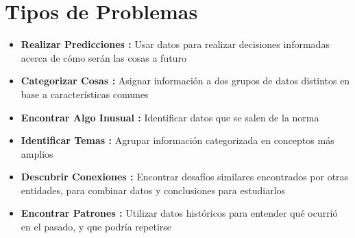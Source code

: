 \section{Tipos de Problemas}

\begin{itemize}
    \item {\textbf{Realizar Predicciones : }Usar datos para realizar decisiones informadas acerca de cómo serán las cosas a futuro}
    \item {\textbf{Categorizar Cosas : }Asignar información a dos grupos de datos distintos en base a características comunes}
    \item {\textbf{Encontrar Algo Inusual : }Identificar datos que se salen de la norma}
    \item {\textbf{Identificar Temas : }Agrupar información categorizada en conceptos más amplios}
    \item {\textbf{Descubrir Conexiones : }Encontrar desafíos similares encontrados por otras entidades, para combinar datos y conclusiones para estudiarlos}
    \item {\textbf{Encontrar Patrones : }Utilizar datos históricos para entender qué ocurrió en el pasado, y que podría repetirse}
\end{itemize}